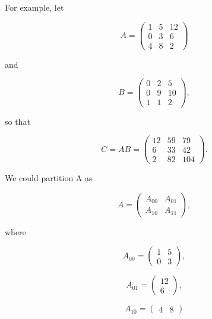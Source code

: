 For example, let 

\begin{equation}
A = 
\left (
\begin{array}{ccc}
1 & 5 & 12 \\
0 & 3 & 6 \\
4 & 8 & 2
\end{array}
\right )
\end{equation}

and

\begin{equation}
B = 
\left (
\begin{array}{ccc}
0 & 2 & 5 \\
0 & 9 & 10 \\
1 & 1 & 2
\end{array}
\right ), 
\end{equation}

so that 

\begin{equation}
C = AB = 
\left (
\begin{array}{ccc}
12 & 59 & 79 \\
6 & 33 & 42 \\
2 & 82 & 104
\end{array}
\right ) .
\end{equation}

We could partition A as

\begin{equation}
A =
\left (
\begin{array}{cc}
A_{00} & A_{01} \\
A_{10} & A_{11}
\end{array}
\right ) ,
\end{equation}

where

\begin{equation}
A_{00} =
\left (
\begin{array}{cc}
1 & 5 \\
0 & 3
\end{array}
\right )  ,
\end{equation}

\begin{equation}
A_{01} =
\left (
\begin{array}{cc}
12 \\
6 
\end{array}
\right ),
\end{equation}

\begin{equation}
A_{10} =
\left (
\begin{array}{cc}
4 & 8 
\end{array}
\right )  
\end{equation}

